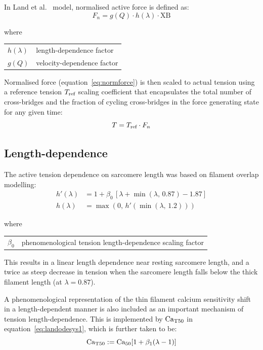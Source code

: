 \vspace{0.3cm}
In Land et al.~\cite{Land:2012} model, normalised active force is defined as:
%
\begin{equation}\label{eq:normforce}
    F_n = g(Q)\cdot h(\lambda)\cdot \text{XB}
\end{equation}

\noindent
where

\vspace{0.2cm}
\begin{tabular}{ll}
    $h(\lambda)$ & length-dependence factor \\
    $g(Q)$       & velocity-dependence factor
\end{tabular}

\vspace{0.3cm}\noindent
Normalised force (equation~\eqref{eq:normforce}) is then scaled to actual tension using a reference tension $T_{\textrm{ref}}$ scaling coefficient that encapsulates the total number of cross-bridges and the fraction of cycling cross-bridges in the force generating state for any given time:
%
\begin{equation}
    T = T_{\textrm{ref}}\cdot F_n
\end{equation}
 
%
%
%
\subsection{Length-dependence}\label{sec:ch2lengthdependence}
The active tension dependence on sarcomere length was based on filament overlap modelling:
%
\begin{align}
    h'(\lambda) &= 1+\beta_0\,[\lambda+\min(\lambda,\,0.87)-1.87] \\
    h(\lambda) &= \max(0,\,h'(\min(\lambda,\,1.2)))
\end{align}

\noindent
where

\vspace{0.2cm}
\begin{tabular}{ll}
    $\beta_0$ & phenomenological tension length-dependence scaling factor
\end{tabular}

\vspace{0.3cm}\noindent
This results in a linear length dependence near resting sarcomere length, and a twice as steep decrease in tension when the sarcomere length falls below the thick filament length (at $\lambda = 0.87$).

\vspace{0.2cm}
A phenomenological representation of the thin filament calcium sensitivity shift in a length-dependent manner is also included as an important mechanism of tension length-dependence. This is implemented by $\textrm{Ca}_{\textrm{T}50}$ in equation~\eqref{eq:landodesys1}, which is further taken to be:
%
\begin{equation}\label{eq:Caift}
    \textrm{Ca}_{\textrm{T}50}:=\textrm{Ca}_{50}[1 + \beta_1(\lambda - 1)]
\end{equation}

